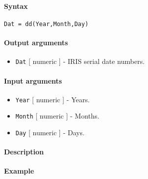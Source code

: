 


	\paragraph{Syntax}\label{syntax}

\begin{verbatim}
Dat = dd(Year,Month,Day)
\end{verbatim}

\paragraph{Output arguments}\label{output-arguments}

\begin{itemize}
\itemsep1pt\parskip0pt
\item
  \texttt{Dat} {[} numeric {]} - IRIS serial date numbers.
\end{itemize}

\paragraph{Input arguments}\label{input-arguments}

\begin{itemize}
\item
  \texttt{Year} {[} numeric {]} - Years.
\item
  \texttt{Month} {[} numeric {]} - Months.
\item
  \texttt{Day} {[} numeric {]} - Days.
\end{itemize}

\paragraph{Description}\label{description}

\paragraph{Example}\label{example}


